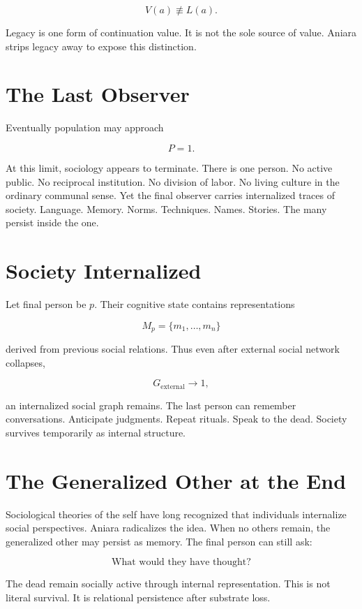 \documentclass[11pt,oneside]{book}
\theoremstyle{definition}
\theoremstyle{remark}
\begin{document}
\[
V(a) \not\equiv L(a).
\]

Legacy is one form of continuation value. It is not the sole source of value. Aniara strips legacy
away to expose this distinction.

\section{The Last Observer}

Eventually population may approach

\[
P=1.
\]

At this limit, sociology appears to terminate. There is one person. No active public. No reciprocal
institution. No division of labor. No living culture in the ordinary communal sense. Yet the final
observer carries internalized traces of society. Language. Memory. Norms. Techniques. Names.
Stories. The many persist inside the one.

\section{Society Internalized}

Let final person be \(p\). Their cognitive state contains representations

\[
M_p = \{m_1,\ldots,m_n\}
\]

derived from previous social relations. Thus even after external social network collapses,

\[
G_{\mathrm{external}}\rightarrow1,
\]

an internalized social graph remains. The last person can remember conversations. Anticipate
judgments. Repeat rituals. Speak to the dead. Society survives temporarily as internal structure.

\section{The Generalized Other at the End}

Sociological theories of the self have long recognized that individuals internalize social
perspectives. Aniara radicalizes the idea. When no others remain, the generalized other may persist
as memory. The final person can still ask:

\[
\text{What would they have thought?}
\]

The dead remain socially active through internal representation. This is not literal survival. It is
relational persistence after substrate loss.
\end{document}
